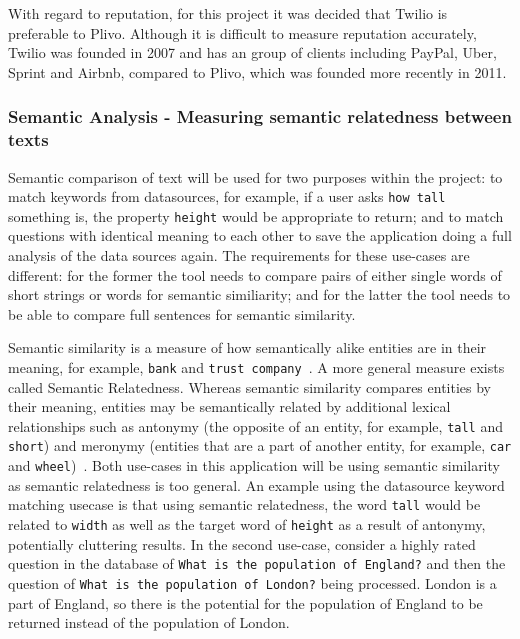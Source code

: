 \documentclass[authoryearcitations]{UoYCSproject}
\begin{document}
With regard to reputation, for this project it was decided that Twilio is preferable to Plivo. Although it is difficult to measure reputation accurately, Twilio was founded in 2007 and has an group of clients including PayPal, Uber, Sprint and Airbnb, compared to Plivo, which was founded more recently in 2011.

\subsubsection{Semantic Analysis - Measuring semantic relatedness between texts}
\label{sec:choosingSemanticAnalysisApi}
Semantic comparison of text will be used for two purposes within the project: to match keywords from datasources, for example, if a user asks \texttt{how tall} something is, the property \texttt{height} would be appropriate to return; and to match questions with identical meaning to each other to save the application doing a full analysis of the data sources again. The requirements for these use-cases are different: for the former the tool needs to compare pairs of either single words of short strings or words for semantic similiarity; and for the latter the tool needs to be able to compare full sentences for semantic similarity.

Semantic similarity is a measure of how semantically alike entities are in their meaning, for example, \texttt{bank} and \texttt{trust company}~\cite{Budanitsky:2006:EWM:1168106.1168108}. A more general measure exists called Semantic Relatedness. Whereas semantic similarity compares entities by their meaning, entities may be semantically related by additional lexical relationships such as antonymy (the opposite of an entity, for example, \texttt{tall} and \texttt{short}) and meronymy (entities that are a part of another entity, for example, \texttt{car} and \texttt{wheel})~\cite{Budanitsky:2006:EWM:1168106.1168108, budanitsky2001semantic}. Both use-cases in this application will be using semantic similarity as semantic relatedness is too general. An example using the datasource keyword matching usecase is that using semantic relatedness, the word \texttt{tall} would be related to \texttt{width} as well as the target word of \texttt{height} as a result of antonymy, potentially cluttering results. In the second use-case, consider a highly rated question in the database of \texttt{What is the population of England?} and then the question of \texttt{What is the population of London?} being processed. London is a part of England, so there is the potential for the population of England to be returned instead of the population of London.
\end{document}
